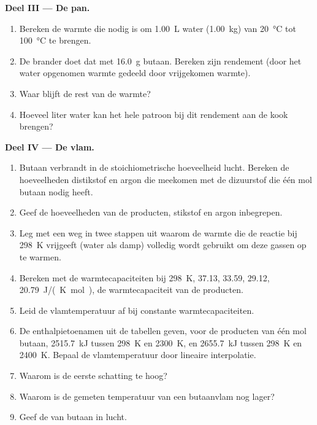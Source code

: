 \begin{problem}
\medskip
\noindent\textbf{Deel III --- De pan.}
\begin{enumerate}[resume]
  \item Bereken de warmte die nodig is om \qty{1.00}{L} water
        (\qty{1.00}{kg}) van \qty{20}{\celsius} tot \qty{100}{\celsius} te brengen.
  \item De brander doet dat met \qty{16.0}{g} butaan. Bereken zijn
        rendement (door het water opgenomen warmte gedeeld door vrijgekomen warmte).
  \item Waar blijft de rest van de warmte?
  \item Hoeveel liter water kan het hele patroon bij dit rendement aan de kook
        brengen?
\end{enumerate}

\medskip
\noindent\textbf{Deel IV --- De vlam.}
\begin{enumerate}[resume]
  \item Butaan verbrandt in de stoichiometrische hoeveelheid lucht. Bereken de
        hoeveelheden distikstof en argon die meekomen met de dizuurstof die
        één mol butaan nodig heeft.
  \item Geef de hoeveelheden van de producten, stikstof en argon inbegrepen.
  \item Leg met een weg in twee stappen uit waarom de warmte die de reactie bij
        \qty{298}{K} vrijgeeft (water als damp) volledig wordt gebruikt om
        deze gassen op te warmen.
  \item Bereken met de warmtecapaciteiten bij \qty{298}{K},  37.13,
         33.59,  29.12,  \qty{20.79}{J/(K.mol)},
        de warmtecapaciteit van de producten.
  \item Leid de vlamtemperatuur af bij constante warmtecapaciteiten.
  \item De enthalpietoenamen uit de tabellen geven, voor de producten van één
        mol butaan, \qty{2515.7}{kJ} tussen \qty{298}{K} en
        \qty{2300}{K}, en \qty{2655.7}{kJ} tussen \qty{298}{K} en
        \qty{2400}{K}. Bepaal de vlamtemperatuur door lineaire interpolatie.
  \item Waarom is de eerste schatting te hoog?
  \item Waarom is de gemeten temperatuur van een butaanvlam nog lager?
  \item Geef de  van butaan in lucht.
\end{enumerate}
\end{problem}
